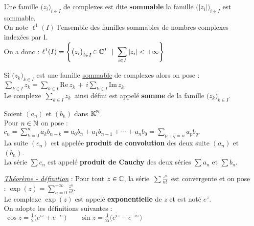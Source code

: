 \vspace{1.3cm}

Une famille \(\bigl(z_i\bigr)_{i\in I}\) de complexes est dite \textbf{sommable} \ssi la famille \(\bigl(|z_i|\bigr)_{i\in I}\) est sommable.\vspace{0.2cm}\\
On note \(\ell^1(I)\) l'ensemble des familles sommables de nombres complexes indexées par I.\vspace{0.2cm}\\
On a donc : \( \displaystyle \ell^1(I)= \left\{ \bigl( z_i \bigr) _{i\in I}\! \in \mathbb{C}^I \ \mid \ \sum_{i\in I} |z_i| < + \infty \right\} \)

\vspace{1.7cm}

Si \(\bigl(z_k\bigr)_{k\in I}\) est une famille \underline{sommable} de complexes alors on pose : \(\displaystyle \sum_{k\in I}z_k = \sum_{k\in I}\text{Re}\,z_k\, +\, i\sum_{k\in I} \text{Im}\,z_k. \)\\
Le complexe \(\,\displaystyle \sum_{k\in I}z_k\,\) ainsi défini est appelé \textbf{somme} de la famille \(\bigl(z_k\bigr)_{k\in I}\).

\newpage

Soient \((a_n)\) et \((b_n)\) dans \(\mathbb{K}^{\mathbb{N}}\).\\
Pour \(n\in \mathbb{N}\) on pose : \(\displaystyle c_n=\sum_{k=0}^{n}a_kb_{n-k}=a_0b_n+a_1b_{n-1}+\cdots+a_nb_0=\sum_{p+q=n}a_pb_q.  \)\\
La suite \((c_n)\) est appelée \textbf{produit de convolution} des deux suite \((a_n)\) et \((b_n)\).\\
La série \(\sum c_n\) est appelé \textbf{produit de Cauchy} des deux séries \(\sum a_n\) et \(\sum b_n\).

\vspace{1cm}

\noindent\underline{\emph{Théorème - définition}} : Pour tout \(z\in \mathbb{C}\), la série \(\,\displaystyle\sum \frac{z^n}{n!}\,\) est convergente et on pose : \(\displaystyle \exp(z)=\sum_{n=0}^{+\infty} \frac{z^n}{n!}. \)\\
Le complexe \(\exp(z)\) est appelé \textbf{exponentielle} de \(z\) et est noté \(e^z\).\vspace{0.5cm}\\
On adopte les définitions suivantes : \(\ \displaystyle \cos z = \frac{1}{2}\bigl(e^{iz}+e^{-iz}\bigr) \qquad \sin z = \frac{1}{2i}\bigl(e^{iz}-e^{-iz}\bigr) \)

